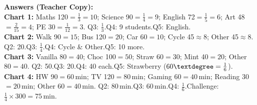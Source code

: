 \documentclass[a4paper,12pt]{article}
\begin{document}
\newpage{}
\begin{mdframed}[backgroundcolor=lightgrey, linecolor=gray,
                 linewidth=1pt, roundcorner=4pt, innertopmargin=5pt]
\textbf{\small Answers (Teacher Copy):}\\[3pt]
{\small
\textbf{Chart 1:}
Maths 120\textdegree\;$=\tfrac{1}{3}=10$;\;
Science 90\textdegree\;$=\tfrac{1}{4}=9$;\;
English 72\textdegree\;$=\tfrac{1}{5}=6$;\;
Art 48\textdegree\;$=\tfrac{2}{15}=4$;\;
PE 30\textdegree\;$=\tfrac{1}{12}=3$.
\;Q3: $\tfrac{1}{3}$.\;Q4: 9 students.\;Q5: English.\\[3pt]
\textbf{Chart 2:}
Walk 90\textdegree\;$=15$;\;
Bus 120\textdegree\;$=20$;\;
Car 60\textdegree\;$=10$;\;
Cycle 45\textdegree\;$\approx8$;\;
Other 45\textdegree\;$\approx8$.
\;Q2: 20.\;Q3: $\tfrac{1}{4}$.\;Q4: Cycle \& Other.\;Q5: 10 more.\\[3pt]
\textbf{Chart 3:}
Vanilla 80\textdegree\;$=40$;\;
Choc 100\textdegree\;$=50$;\;
Straw 60\textdegree\;$=30$;\;
Mint 40\textdegree\;$=20$;\;
Other 80\textdegree\;$=40$.
\;Q2: 50.\;Q3: 20.\;Q4: 40 each.\;Q5: Strawberry ($60\textdegree=\tfrac{1}{6}$).\\[3pt]
\textbf{Chart 4:}
HW 90\textdegree\;$=60$\,min;\;
TV 120\textdegree\;$=80$\,min;\;
Gaming 60\textdegree\;$=40$\,min;\;
Reading 30\textdegree\;$=20$\,min;\;
Other 60\textdegree\;$=40$\,min.
\;Q2: 80\,min.\;Q3: 60\,min.\;Q4: $\tfrac{1}{6}$.\;Challenge: $\tfrac{1}{4}\times300=75$\,min.
}
\end{mdframed}
\end{document}
